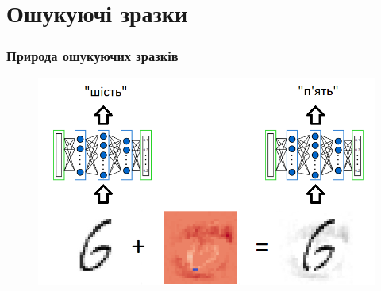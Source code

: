 \documentclass{beamer}
\numberwithin{equation}{section}
\begin{document}
	\section{Ошукуючі зразки}
	\begin{frame}
		\frametitle{Природа ошукуючих зразків}
		\begin{figure}[h]
			\centering
			\includegraphics[width=.9\textwidth]{../images/six-p.png}
			
		\end{figure}
	\end{frame}
	

\end{document}
